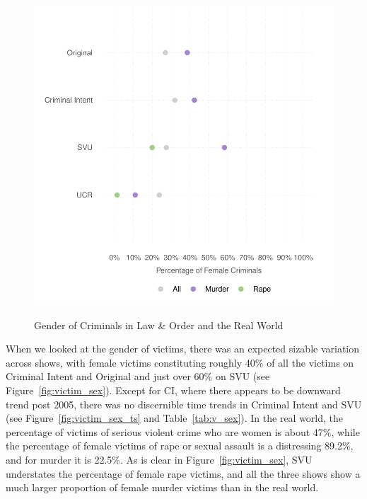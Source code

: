 \documentclass[12pt, letterpaper]{article}
\begin{document}
\begin{figure}[htbp]
\centering
\caption{Gender of Criminals in Law \& Order and the Real World}
\includegraphics[scale=.9]{../figs/all_criminals_by_gender.pdf}
\label{fig:perp_sex}
\end{figure}

When we looked at the gender of victims, there was an expected sizable variation across shows, with female victims constituting roughly 40\% of all the victims on Criminal Intent and Original and just over 60\% on SVU (see Figure~\ref{fig:victim_sex}). Except for CI, where there appears to be downward trend post 2005, there was no discernible time trends in Criminal Intent and SVU (see Figure~\ref{fig:victim_sex_ts} and Table~\ref{tab:v_sex}). In the real world, the percentage of victims of serious violent crime who are women is about 47\%, while the percentage of female victims of rape or sexual assault is a distressing 89.2\%, and for murder it is 22.5\%. As is clear in Figure~\ref{fig:victim_sex}, SVU understates the percentage of female rape victims, and all the three shows show a much larger proportion of female murder victims than in the real world.   
\end{document}
